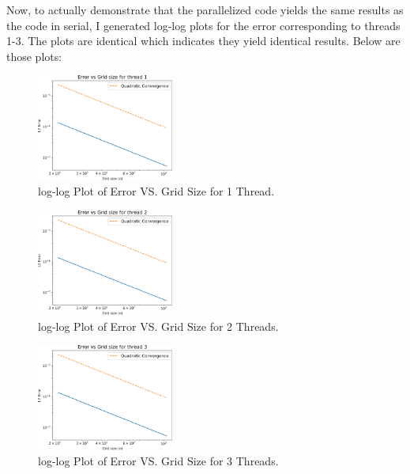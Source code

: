 \documentclass[12pt]{article}
\begin{document}
\noindent Now, to actually demonstrate that the parallelized code yields the same results as the code in serial, I generated log-log plots for the error corresponding to threads 1-3. The plots are identical which indicates they yield identical results. Below are those plots:

\begin{figure}[H]
    \centering
    \includegraphics[width=0.4\textwidth]{error1.png}
    \caption{log-log Plot of Error VS. Grid Size for 1 Thread.}
\end{figure}

\begin{figure}[H]
    \centering
    \includegraphics[width=0.4\textwidth]{error2.png}
    \caption{log-log Plot of Error VS. Grid Size for 2 Threads.}
\end{figure}

\begin{figure}[H]
    \centering
    \includegraphics[width=0.4\textwidth]{error3.png}
    \caption{log-log Plot of Error VS. Grid Size for 3 Threads.}
\end{figure}
\end{document}
